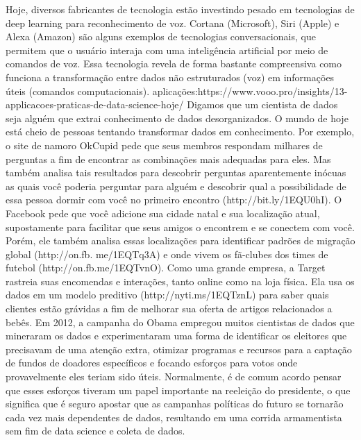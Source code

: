 Hoje, diversos fabricantes de tecnologia estão investindo pesado em tecnologias de deep learning para reconhecimento de voz. Cortana (Microsoft), Siri (Apple) e Alexa (Amazon) são alguns exemplos de tecnologias conversacionais, que permitem que o usuário interaja com uma inteligência artificial por meio de comandos de voz. Essa tecnologia revela de forma bastante compreensiva como funciona a transformação entre dados não estruturados (voz) em informações úteis (comandos computacionais).
aplicações:https://www.vooo.pro/insights/13-applicacoes-praticas-de-data-science-hoje/
 Digamos que um cientista de dados seja alguém que extrai conhecimento de dados desorganizados. O mundo de hoje está cheio de pessoas tentando transformar dados em conhecimento. Por exemplo, o site de namoro OkCupid pede que seus membros respondam milhares de perguntas a fim de encontrar as combinações mais adequadas para eles. Mas também analisa tais resultados para descobrir perguntas aparentemente inócuas as quais você poderia perguntar para alguém e descobrir qual a possibilidade de essa pessoa dormir com você no primeiro encontro (http://bit.ly/1EQU0hI). O Facebook pede que você adicione sua cidade natal e sua localização atual, supostamente para facilitar que seus amigos o encontrem e se conectem com você. Porém, ele também analisa essas localizações para identificar padrões de migração global (http://on.fb. me/1EQTq3A) e onde vivem os fã-clubes dos times de futebol (http://on.fb.me/1EQTvnO). Como uma grande empresa, a Target rastreia suas encomendas e interações, tanto online como na loja física. Ela usa os dados em um modelo preditivo (http://nyti.ms/1EQTznL) para saber quais clientes estão grávidas a fim de melhorar sua oferta de artigos relacionados a bebês. Em 2012, a campanha do Obama empregou muitos cientistas de dados que mineraram os dados e experimentaram uma forma de identificar os eleitores que precisavam de uma atenção extra, otimizar programas e recursos para a captação de fundos de doadores específicos e focando esforços para votos onde provavelmente eles teriam sido úteis. Normalmente, é de comum acordo pensar que esses esforços tiveram um papel importante na reeleição do presidente, o que significa que é seguro apostar que as campanhas políticas do futuro se tornarão cada vez mais dependentes de dados, resultando em uma corrida armamentista sem fim de data science e coleta de dados.

